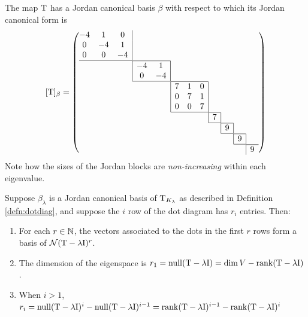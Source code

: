\begin{example}{}{}
	The map $\mathrm{T}$ has a Jordan canonical basis $\beta$ with respect to which its Jordan canonical form is
	\[
		[\rT]_\beta =\left(
		\begin{array}{@{}c@{}c@{}c@{}c@{}c@{}c@{}c@{}c@{}}
			\begin{array}{@{}ccc|@{}}
				-4 & 1 & 0\\
 				0 & -4 & 1\\
 				0 & 0 & -4\\\hline
			\end{array}
			\\
 			&
 			\begin{array}{@{}|cc|@{}}
 				\hline
 				-4 & 1\\
 				0 & -4\\\hline
 			\end{array}
 			\\
			&&
			\begin{array}{|ccc|}\hline
 				7 & 1 & 0\\
 				0 & 7 & 1\\
 				0 & 0 & 7\\\hline
 			\end{array}
 			\\
 			&&&
 			\begin{array}{|c|}\hline
 				7\\\hline
 			\end{array}
 			\\
			&&&&
			\begin{array}{|c|}\hline
				9\\\hline
			\end{array}
			\\
			&&&&&
			\begin{array}{|c|}\hline
				9\\\hline
			\end{array}
			\\
			&&&&&&
			\begin{array}{|c}\hline
				9
			\end{array}
		\end{array}
		\right)
	\]
	Note how the sizes of the Jordan blocks are \emph{non-increasing} within each eigenvalue.
\end{example}


\pagebreak[3]


\begin{thm}{}{}
	Suppose $\beta_\lambda$ is a Jordan canonical basis of $\mathrm{T}_{K_\lambda}$ as described in Definition \ref{defn:dotdiag}, and suppose the $i$\th{} row of the dot diagram has $r_i$ entries. Then:
	\begin{enumerate}
	  \item For each $r\in\mathbb{N}$, the vectors associated to the dots in the first $r$ rows form a basis of $\mathcal{N}(\mathrm{T}-\lambda \mathrm{I})^r$.
	  \item The dimension of the eigenspace is $r_1=\operatorname{null}(\mathrm{T}-\lambda\mathrm{I})=\dim V-\operatorname{rank}(\mathrm{T}-\lambda \mathrm{I})$.
	  \item When $i>1$, $r_i=\operatorname{null}(\mathrm{T}-\lambda \mathrm{I})^{i}-\operatorname{null}(\mathrm{T}-\lambda \mathrm{I})^{i-1}= \operatorname{rank}(\mathrm{T}-\lambda \mathrm{I})^{i-1}-\operatorname{rank}(\mathrm{T}-\lambda \mathrm{I})^{i}$
	\end{enumerate}
\end{thm}

